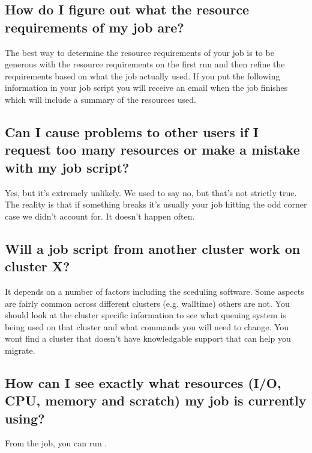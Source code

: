 \documentclass[letterpaper,10pt,english]{sphinxmanual}
\begin{document}
\subsection{How do I figure out what the resource requirements of my job are?}
\label{\detokenize{faq:how-do-i-figure-out-what-the-resource-requirements-of-my-job-are}}
The best way to determine the resource requirements of your job is to be generous with the resource requirements on the first run and then refine the requirements based on what the job actually used. If you put the following information in your job script you will receive an email when the job finishes which will include a summary of the resources used.

\begin{sphinxVerbatim}[commandchars=\\\{\}]
\end{sphinxVerbatim}


\subsection{Can I cause problems to other users if I request too many resources or make a mistake with my job script?}
\label{\detokenize{faq:can-i-cause-problems-to-other-users-if-i-request-too-many-resources-or-make-a-mistake-with-my-job-script}}
Yes, but it’s extremely unlikely. We used to say no, but that’s not strictly true. The reality is that if something breaks it’s usually your job hitting the odd corner case we didn’t account for. It doesn’t happen often.


\subsection{Will a job script from another cluster work on cluster X?}
\label{\detokenize{faq:will-a-job-script-from-another-cluster-work-on-cluster-x}}
It depends on a number of factors including the sceduling software. Some aspects are fairly common across different clusters (e.g. walltime) others are not. You should look at the cluster specific information to see what queuing system is being used on that cluster and what commands you will need to change. You wont find a cluster that doesn’t have knowledgable support that can help you migrate.


\subsection{How can I see exactly what resources (I/O, CPU, memory and scratch) my job is currently using?}
\label{\detokenize{faq:how-can-i-see-exactly-what-resources-i-o-cpu-memory-and-scratch-my-job-is-currently-using}}
From  the job, you can run .
\end{document}
